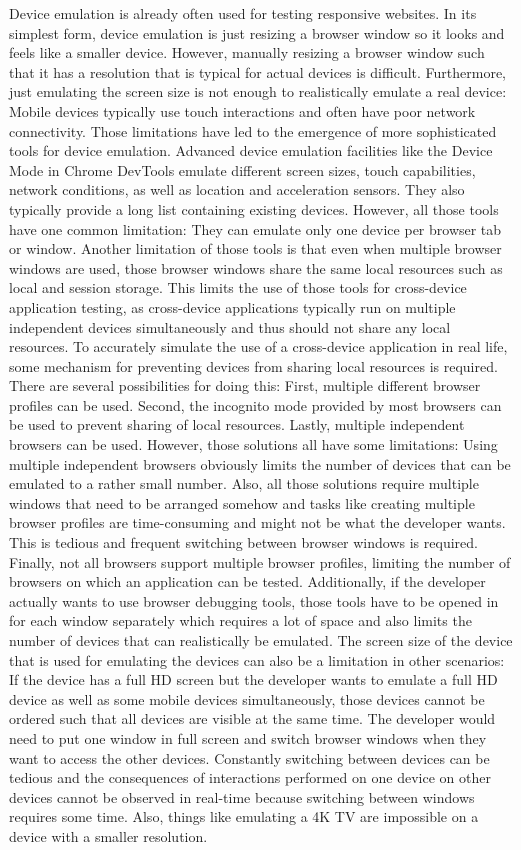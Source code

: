 Device emulation is already often used for testing responsive websites. In its simplest form, device emulation is just resizing a browser window so it looks and feels like a smaller device. However, manually resizing a browser window such that it has a resolution that is typical for actual devices is difficult. Furthermore, just emulating the screen size is not enough to realistically emulate a real device: Mobile devices typically use touch interactions and often have poor network connectivity. Those limitations have led to the emergence of more sophisticated tools for device emulation. Advanced device emulation facilities like the Device Mode in Chrome DevTools emulate different screen sizes, touch capabilities, network conditions, as well as location and acceleration sensors. They also typically provide a long list containing existing devices. However, all those tools have one common limitation: They can emulate only one device per browser tab or window. Another limitation of those tools is that even when multiple browser windows are used, those browser windows share the same local resources such as local and session storage. This limits the use of those tools for cross-device application testing, as cross-device applications typically run on multiple independent devices simultaneously and thus should not share any local resources. To accurately simulate the use of a cross-device application in real life, some mechanism for preventing devices from sharing local resources is required. There are several possibilities for doing this: First, multiple different browser profiles can be used. Second, the incognito mode provided by most browsers can be used to prevent sharing of local resources. Lastly, multiple independent browsers can be used. However, those solutions all have some limitations: Using multiple independent browsers obviously limits the number of devices that can be emulated to a rather small number. Also, all those solutions require multiple windows that need to be arranged somehow and tasks like creating multiple browser profiles are time-consuming and might not be what the developer wants. This is tedious and frequent switching between browser windows is required. Finally, not all browsers support multiple browser profiles, limiting the number of browsers on which an application can be tested. Additionally, if the developer actually wants to use browser debugging tools, those tools have to be opened in for each window separately which requires a lot of space and also limits the number of devices that can realistically be emulated. The screen size of the device that is used for emulating the devices can also be a limitation in other scenarios: If the device has a full HD screen but the developer wants to emulate a full HD device as well as some mobile devices simultaneously, those devices cannot be ordered such that all devices are visible at the same time. The developer would need to put one window in full screen and switch browser windows when they want to access the other devices. Constantly switching between devices can be tedious and the consequences of interactions performed on one device on other devices cannot be observed in real-time because switching between windows requires some time. Also, things like emulating a 4K TV are impossible on a device with a smaller resolution. 

